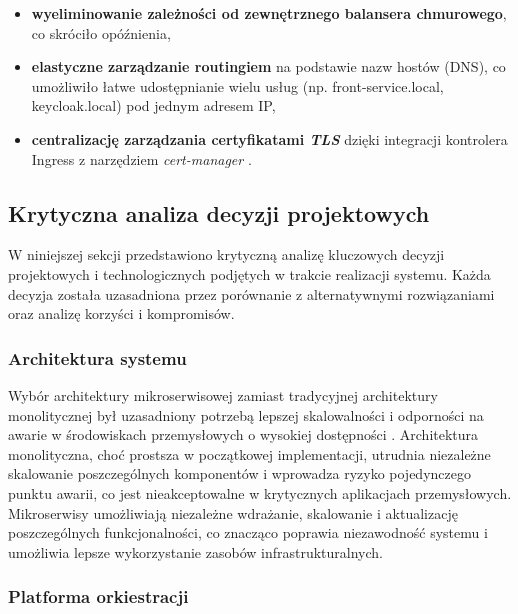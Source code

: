 \vspace{0.3em}

\begin{itemize}
    \item \textbf{wyeliminowanie zależności od zewnętrznego balansera chmurowego}, co skróciło opóźnienia,
    \item \textbf{elastyczne zarządzanie routingiem} na podstawie nazw hostów (DNS), co umożliwiło łatwe udostępnianie wielu usług (np. front-service.local, keycloak.local) pod jednym adresem IP,
    \item \textbf{centralizację zarządzania certyfikatami \textit{TLS}} dzięki integracji kontrolera Ingress z narzędziem \textit{cert-manager} \cite{cert_manager_docs}.
\end{itemize}

\subsection{Krytyczna analiza decyzji projektowych}

W niniejszej sekcji przedstawiono krytyczną analizę kluczowych decyzji projektowych i technologicznych podjętych w trakcie realizacji systemu. Każda decyzja została uzasadniona przez porównanie z alternatywnymi rozwiązaniami oraz analizę korzyści i kompromisów.

\subsubsection{Architektura systemu}

Wybór architektury mikroserwisowej zamiast tradycyjnej architektury monolitycznej był uzasadniony potrzebą lepszej skalowalności i odporności na awarie w środowiskach przemysłowych o wysokiej dostępności \cite{microservice_benefits}. Architektura monolityczna, choć prostsza w początkowej implementacji, utrudnia niezależne skalowanie poszczególnych komponentów i wprowadza ryzyko pojedynczego punktu awarii, co jest nieakceptowalne w krytycznych aplikacjach przemysłowych. Mikroserwisy umożliwiają niezależne wdrażanie, skalowanie i aktualizację poszczególnych funkcjonalności, co znacząco poprawia niezawodność systemu i umożliwia lepsze wykorzystanie zasobów infrastrukturalnych.

\subsubsection{Platforma orkiestracji}

